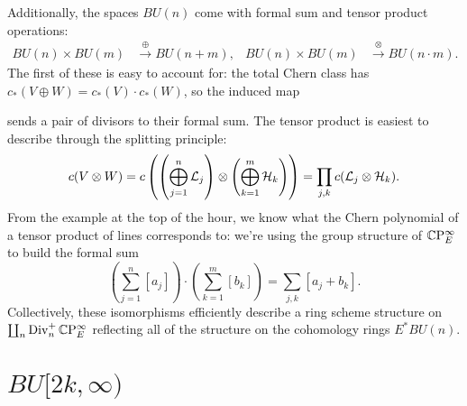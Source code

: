 Additionally, the spaces $BU(n)$ come with formal sum and tensor product operations:
\begin{align*}
BU(n) \times BU(m) & \xrightarrow{\oplus} BU(n+m), & BU(n) \times BU(m) & \xrightarrow{\otimes} BU(n \cdot m).
\end{align*}
The first of these is easy to account for: the total Chern class has $c_*(V \oplus W) = c_*(V) \cdot c_*(W)$, so the induced map
\begin{center}
\end{center}
sends a pair of divisors to their formal sum.  The tensor product is easiest to describe through the splitting principle:
\[
c(V \otimes W) = c\left( \left( \bigoplus_{j=1}^n \mathcal{L}_j\right) \otimes \left( \bigoplus_{k=1}^m \mathcal{H}_k \right)\right) = \prod_{j, k} c(\mathcal{L}_j \otimes \mathcal{H}_k).
\]
From the example at the top of the hour, we know what the Chern polynomial of a tensor product of lines corresponds to: we're using the group structure of $\mathbb{C}\mathrm P^\infty_E$ to build the formal sum \[\left( \sum_{j=1}^n [a_j] \right) \cdot \left( \sum_{k=1}^m [b_k]\right) = \sum_{j,k} [a_j + b_k].\]  Collectively, these isomorphisms efficiently describe a ring scheme structure on $\coprod_n \operatorname{Div}_n^+ \mathbb{C}\mathrm P^\infty_E$ reflecting all of the structure on the cohomology rings $E^* BU(n)$.



\section{$BU[2k, \infty)$}

